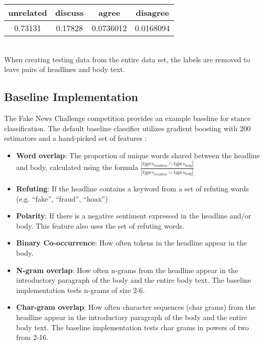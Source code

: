 \documentclass[11pt,a4paper]{article}
\begin{document}
\begin{tabular}{|c | c | c | c|}
\hline
unrelated & discuss & agree & disagree \\ \hline
0.73131 & 0.17828 &	0.0736012 &	0.0168094 \\ \hline
\end{tabular} \\

When creating testing data from the entire data set, the labels are removed to leave pairs of headlines and body text.


\subsection{Baseline Implementation}
The Fake News Challenge competition provides an example baseline for stance classification. The default baseline classifier utilizes gradient boosting with 200 estimators and a hand-picked set of features \cite{fakenewschallenge}:

\begin{itemize}
	\item \textbf{Word overlap}: The proportion of unique words shared between the headline and body, calculated using the formula $\frac{\left\vert{types_{headline} \cap types_{body}}\right\vert}
							{\left\vert{types_{headline} \cup types_{body}}\right\vert}$
	
	\item \textbf{Refuting}: If the headline contains a keyword from a set of refuting words (e.g. “fake”, “fraud”, “hoax”) 
	
	\item \textbf{Polarity}: If there is a negative sentiment expressed in the headline and/or body. This feature also uses the set of refuting words.
	
	\item \textbf{Binary Co-occurrence}: How often tokens in the headline appear in the body.
	
	\item \textbf{N-gram overlap}: How often n-grams from the headline appear in the introductory paragraph of the body and the entire body text. The baseline implementation tests n-grams of size 2-6.
	
	\item \textbf{Char-gram overlap}: How often character sequences (char grams) from the headline appear in the introductory paragraph of the body and the entire body text. The baseline implementation tests char grams in powers of two from 2-16.	
\end{itemize} 
\end{document}
